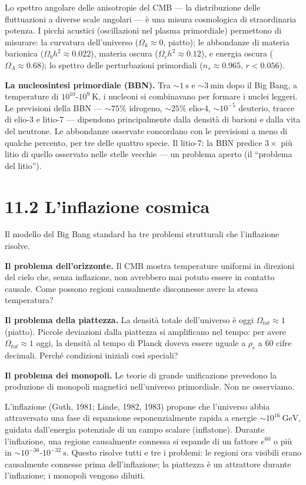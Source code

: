 \documentclass[11.5pt,a4paper,openany]{book}
\theoremstyle{remark}
\begin{document}
Lo spettro angolare delle anisotropie del CMB --- la distribuzione delle fluttuazioni a diverse scale angolari --- è una misura cosmologica di straordinaria potenza. I picchi acustici (oscillazioni nel plasma primordiale) permettono di misurare: la curvatura dell'universo ($\Omega_k \approx 0$, piatto); le abbondanze di materia barionica ($\Omega_b h^2 \approx 0.022$), materia oscura ($\Omega_c h^2 \approx 0.12$), e energia oscura ($\Omega_\Lambda \approx 0.68$); lo spettro delle perturbazioni primordiali ($n_s \approx 0.965$, $r < 0.056$).

\textbf{La nucleosintesi primordiale (BBN).} Tra $\sim 1\ \text{s}$ e $\sim 3\ \text{min}$ dopo il Big Bang, a temperature di $10^{10}$-$10^9\ \text{K}$, i nucleoni si combinavano per formare i nuclei leggeri. Le previsioni della BBN --- $\sim 75\%$ idrogeno, $\sim 25\%$ elio-4, $\sim 10^{-5}$ deuterio, tracce di elio-3 e litio-7 --- dipendono principalmente dalla densità di barioni e dalla vita del neutrone. Le abbondanze osservate concordano con le previsioni a meno di qualche percento, per tre delle quattro specie. Il litio-7: la BBN predice $3\times$ più litio di quello osservato nelle stelle vecchie --- un problema aperto (il ``problema del litio'').

\section{11.2 L'inflazione cosmica}

Il modello del Big Bang standard ha tre problemi strutturali che l'inflazione risolve.

\textbf{Il problema dell'orizzonte.} Il CMB mostra temperature uniformi in direzioni del cielo che, senza inflazione, non avrebbero mai potuto essere in contatto causale. Come possono regioni causalmente disconnesse avere la stessa temperatura?

\textbf{Il problema della piattezza.} La densità totale dell'universo è oggi $\Omega_{tot} \approx 1$ (piatto). Piccole deviazioni dalla piattezza si amplificano nel tempo: per avere $\Omega_{tot} \approx 1$ oggi, la densità al tempo di Planck doveva essere uguale a $\rho_c$ a 60 cifre decimali. Perché condizioni iniziali così speciali?

\textbf{Il problema dei monopoli.} Le teorie di grande unificazione prevedono la produzione di monopoli magnetici nell'universo primordiale. Non ne osserviamo.

L'inflazione (Guth, 1981; Linde, 1982, 1983) propone che l'universo abbia attraversato una fase di espansione esponenzialmente rapida a energie $\sim 10^{16}\ \text{GeV}$, guidata dall'energia potenziale di un campo scalare (inflatone). Durante l'inflazione, una regione causalmente connessa si espande di un fattore $e^{60}$ o più in $\sim 10^{-36}$-$10^{-32}\ \text{s}$. Questo risolve tutti e tre i problemi: le regioni ora visibili erano causalmente connesse prima dell'inflazione; la piattezza è un attrattore durante l'inflazione; i monopoli vengono diluiti.
\end{document}
